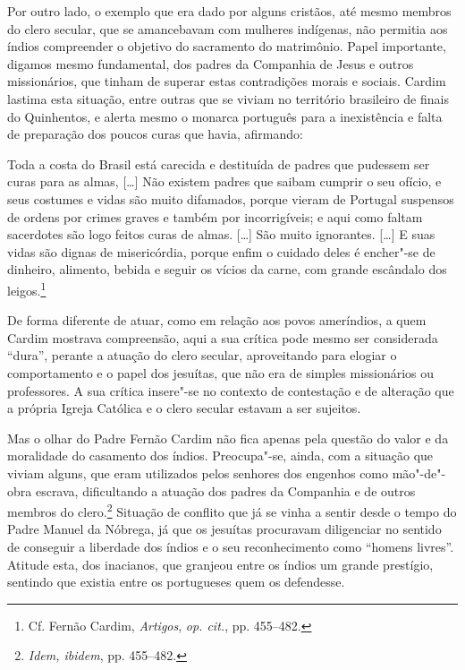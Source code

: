 Por outro lado, o exemplo que era dado por alguns cristãos, até
mesmo membros do clero secular, que se amancebavam com mulheres
indígenas, não permitia aos índios compreender o objetivo do
sacramento do matrimônio. Papel importante, digamos mesmo fundamental,
dos padres da Companhia de Jesus e outros missionários, que tinham de
superar estas contradições morais e sociais. Cardim lastima esta
situação, entre outras que se viviam no território brasileiro de
finais do Quinhentos, e alerta mesmo o monarca português para a
inexistência e falta de preparação dos poucos curas que havia,
afirmando:

\begin{hedraquote}
Toda a costa do Brasil está carecida e destituída de padres
que pudessem ser curas para as almas, [\ldots] Não existem padres que
saibam cumprir o seu ofício, e seus costumes e vidas são muito
difamados, porque vieram de Portugal suspensos de ordens por crimes
graves e também por incorrigíveis; e aqui como faltam sacerdotes são
logo feitos curas de almas. [\ldots] São muito ignorantes. [\ldots] E suas
vidas são dignas de misericórdia, porque enfim o cuidado deles é
encher"-se de dinheiro, alimento, bebida e seguir os vícios da carne,
com grande escândalo dos leigos.\footnote{ Cf. Fernão Cardim,
\textit{Artigos}, \textit{op. cit.}, pp. 455--482.}
\end{hedraquote}

 De forma diferente de atuar, como em relação aos povos
ameríndios, a quem Cardim mostrava compreensão, aqui a sua crítica
pode mesmo ser considerada ``dura'', perante a atuação do clero
secular, aproveitando para elogiar o comportamento e o papel dos
jesuítas, que não era de simples missionários ou professores. A sua
crítica insere"-se no contexto de contestação e de alteração que a
própria Igreja Católica e o clero secular estavam a ser sujeitos.

Mas o olhar do Padre Fernão Cardim não fica apenas pela questão do
valor e da moralidade do casamento dos índios. Preocupa"-se, ainda, com
a situação que viviam alguns, que eram utilizados pelos senhores dos
engenhos como mão"-de"-obra escrava, dificultando a atuação dos padres
da Companhia e de outros membros do clero.\footnote{ \textit{Idem, ibidem}, 
pp. 455--482.} Situação de conflito que já se vinha a
sentir desde o tempo do Padre Manuel da Nóbrega, já que os jesuítas
procuravam diligenciar no sentido de conseguir a liberdade dos índios e
o seu reconhecimento como ``homens livres''. Atitude esta, dos inacianos,
que granjeou entre os índios um grande prestígio, sentindo que existia
entre os portugueses quem os defendesse. 


